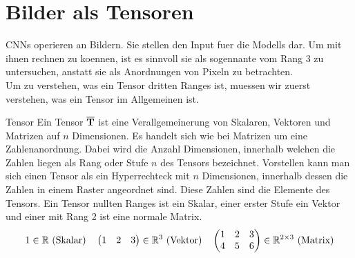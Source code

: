 \section{Bilder als Tensoren}
CNNs operieren an Bildern. Sie stellen den Input fuer die Modells dar.
Um mit ihnen rechnen zu koennen, ist es sinnvoll sie als sogennante
 vom Rang 3 zu untersuchen, anstatt sie als Anordnungen von
Pixeln zu betrachten. \\
Um zu verstehen, was ein Tensor dritten Ranges ist, muessen wir zuerst verstehen, was ein Tensor im Allgemeinen ist.

\begin{defbox}{Tensor}
  Ein Tensor $\overline{\mathbf{T}}$ ist eine Verallgemeinerung von Skalaren, Vektoren und Matrizen auf
  $n$ Dimensionen. Es handelt sich wie bei Matrizen um
  eine Zahlenanordnung. Dabei wird die Anzahl Dimensionen, innerhalb welchen die
  Zahlen liegen als Rang oder Stufe $n$ des Tensors bezeichnet. Vorstellen kann man sich einen Tensor
  als ein Hyperrechteck mit $n$ Dimensionen, innerhalb dessen die Zahlen in
  einem Raster angeordnet sind. Diese Zahlen sind die Elemente des Tensors.
  Ein Tensor nullten Ranges ist ein Skalar, einer erster Stufe ein Vektor und
  einer mit Rang 2 ist eine normale Matrix.
  \begin{gather*}
    1 \in \mathbb{R} \text{ (Skalar)} \quad \begin{pmatrix} 1 & 2 & 3 \end{pmatrix}
    \in \mathbb{R}^3 \text{ (Vektor)} \quad
    \begin{pmatrix}
      1 & 2 & 3 \\
      4 & 5 & 6 \\
    \end{pmatrix} \in \mathbb{R}^{2 \times 3} \text{ (Matrix)}
  \end{gather*}


\end{defbox}

